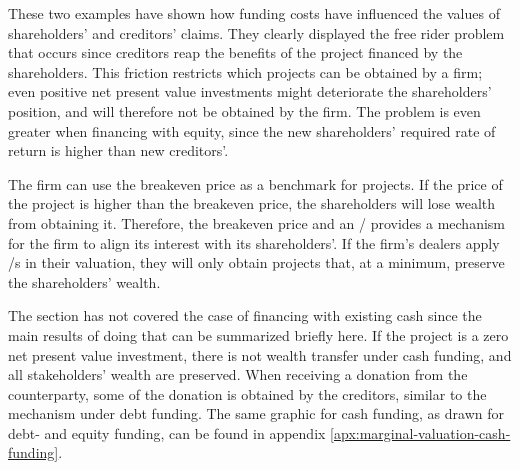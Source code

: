 \documentclass[main.tex]{subfiles}
\begin{document}
    These two examples have shown how funding costs have influenced 
    the values of shareholders' and creditors' claims.
    They clearly displayed the free rider problem that occurs
    since creditors reap the benefits of the project financed by the shareholders.
    This friction restricts which projects can be obtained by a firm;
    even positive net present value investments might deteriorate the shareholders' position,
    and will therefore not be obtained by the firm.
    The problem is even greater when financing with equity, 
    since the new shareholders' required rate of return is higher than new creditors'.
   
    The firm can use the breakeven price as a benchmark for projects. 
    If the price of the project is higher than the breakeven price, 
    the shareholders will lose wealth from obtaining it.
    Therefore, the breakeven price and an \FVA/ provides a mechanism for the firm
    to align its interest with its shareholders'.
    If the firm's dealers apply \FVA/s in their valuation,
    they will only obtain projects that, at a minimum, preserve the shareholders' wealth.
    
    The section has not covered the case of financing with existing cash
    since the main results of doing that can be summarized briefly here.
    If the project is a zero net present value investment, 
    there is not wealth transfer under cash funding,
    and all stakeholders' wealth are preserved.
    When receiving a donation from the counterparty, 
    some of the donation is obtained by the creditors, similar to the mechanism under debt funding.
    The same graphic for cash funding, as drawn for debt- and equity funding, can be found in appendix
    \ref{apx:marginal-valuation-cash-funding}.
\end{document}
